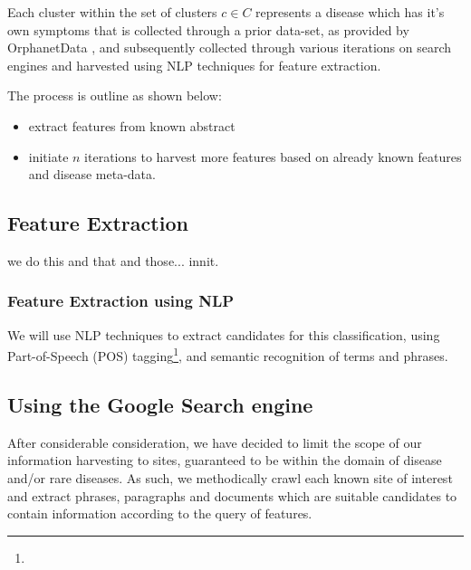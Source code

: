 \documentclass[10pt,letterpaper,final]{article}
\begin{document}
Each cluster within the set of clusters $c \in C$ represents a disease
which has it's own symptoms that is collected through a prior data-set,
as provided by OrphanetData , and subsequently
collected through various iterations on search engines and harvested
using NLP techniques for feature extraction.

The process is outline as shown below:
\begin{itemize}
\item extract features from known abstract
\item initiate $n$ iterations to harvest more features based on already
known features and disease meta-data.
\end{itemize}


\subsection{Feature Extraction}
we do this and that and those... innit.


\subsubsection{Feature Extraction using NLP}

We will use NLP techniques to extract candidates for this
classification, using Part-of-Speech (POS)
tagging\footnote{}, and semantic
recognition of terms and phrases.





\subsection{Using the Google Search engine}
After considerable consideration, we have decided to limit the scope of
our information harvesting to sites, guaranteed to be within the domain
of disease and/or rare diseases. As such, we methodically crawl each
known site of interest and extract phrases, paragraphs and documents
which are suitable candidates to contain information according to the
query of features.
\end{document}
